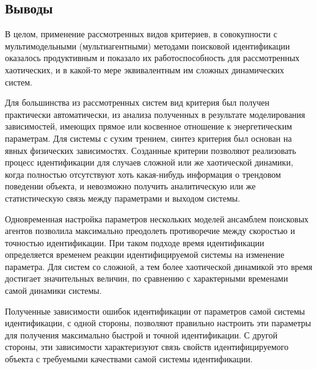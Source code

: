 \documentclass[a4paper,paratype,14pt,fouriernc]{dissatu}
\begin{document}

% 












\subsection*{Выводы}

В целом, применение рассмотренных видов критериев, в совокупности
с мультимодельными (мультиагентными) методами поисковой идентификации
оказалось продуктивным и показало их
работоспособность для рассмотренных хаотических, и в какой-то мере эквивалентным им
сложных динамических систем.



Для большинства из рассмотренных систем вид критерия
был получен практически автоматически, из анализа полученных
в результате моделирования зависимостей, имеющих прямое или косвенное отношение
к энергетическим параметрам. Для системы с сухим трением,
синтез критерия был основан на явных физических зависимостях.
Созданные критерии позволяют реализовать процесс идентификации для случаев
сложной или же хаотической динамики,
когда полностью отсутствуют хоть какая-нибудь информация о
трендовом поведении объекта, и невозможно получить аналитическую
или же статистическую связь между параметрами и выходом системы.

Одновременная настройка параметров нескольких моделей ансамблем поисковых агентов
позволила максимально преодолеть противоречие между скоростью и точностью
идентификации. При таком подходе время идентификации определяется
временем реакции идентифицируемой системы на изменение параметра.
Для систем со сложной, а тем более хаотической динамикой это время достигает
значительных величин, по сравнению с характерными временами самой динамики системы.


Полученные зависимости ошибок идентификации от параметров
самой системы идентификации, с одной стороны, позволяют
правильно настроить эти параметры для получения максимально быстрой
и точной идентификации. С другой стороны, эти зависимости
характеризуют связь свойств идентифицируемого объекта с
требуемыми качествами самой системы идентификации.


\printbibliography
\label{e:atu}{~}

\FloatBarrier
\end{document}
